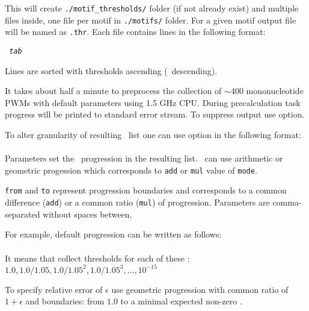 This will create \texttt{./motif\_thresholds/} folder (if not already exist) and multiple files inside, one file per motif in \texttt{./motifs/} folder. For a given motif output file will be named as \texttt{.thr}.
Each file contains lines in the following format:

\texttt{ \textit{tab} }

Lines are sorted with thresholds ascending (\pvalue\ descending).

It takes about half a minute to preprocess the collection of $\sim$400 mononucleotide PWMs with default
parameters using 1.5 GHz CPU. During precalculation task progress will be printed to standard error stream. To suppress output use  option.

To alter granularity of resulting \pvalues\ list one can use  option in the following format:\\
\\

Parameters set the \pvalues\ progression in the resulting list. \pvalues\ can use arithmetic or geometric progession which corresponds to \texttt{add} or \texttt{mul} value of \texttt{mode}.

\texttt{from} and \texttt{to} represent progression boundaries and  corresponds to a common difference (\texttt{add}) or a common ratio (\texttt{mul}) of progression. Parameters are comma-separated without spaces between.

For example, default progression can be written as follows:\\
\\

It means that  collect thresholds for
each of these \pvalues: $1.0, 1.0/1.05, 1.0/1.05^2, 1.0/1.05^3,\ldots,
10^{-15}$

To specify relative error of $\epsilon$ use geometric progression with common ratio of $1+\epsilon$ and boundaries: from $1.0$ to a minimal expected non-zero \pvalue.
